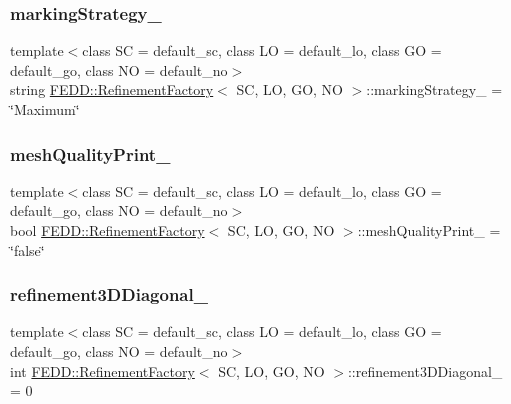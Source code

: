 \subsubsection{\texorpdfstring{marking\+Strategy\+\_\+}{markingStrategy\_}}
{\footnotesize\ttfamily template$<$class SC = default\+\_\+sc, class LO = default\+\_\+lo, class GO = default\+\_\+go, class NO = default\+\_\+no$>$ \\
string \hyperlink{classFEDD_1_1RefinementFactory}{F\+E\+D\+D\+::\+Refinement\+Factory}$<$ SC, LO, GO, NO $>$\+::marking\+Strategy\+\_\+ = \char`\"{}Maximum\char`\"{}}

\mbox{\label{classFEDD_1_1RefinementFactory_a74d0dd46b30f83f868cd749d28375a42}} 
\subsubsection{\texorpdfstring{mesh\+Quality\+Print\+\_\+}{meshQualityPrint\_}}
{\footnotesize\ttfamily template$<$class SC = default\+\_\+sc, class LO = default\+\_\+lo, class GO = default\+\_\+go, class NO = default\+\_\+no$>$ \\
bool \hyperlink{classFEDD_1_1RefinementFactory}{F\+E\+D\+D\+::\+Refinement\+Factory}$<$ SC, LO, GO, NO $>$\+::mesh\+Quality\+Print\+\_\+ = \char`\"{}false\char`\"{}}

\mbox{\label{classFEDD_1_1RefinementFactory_a7466053f06c1d52d6fb2c58db06b7a71}} 
\subsubsection{\texorpdfstring{refinement3\+D\+Diagonal\+\_\+}{refinement3DDiagonal\_}}
{\footnotesize\ttfamily template$<$class SC = default\+\_\+sc, class LO = default\+\_\+lo, class GO = default\+\_\+go, class NO = default\+\_\+no$>$ \\
int \hyperlink{classFEDD_1_1RefinementFactory}{F\+E\+D\+D\+::\+Refinement\+Factory}$<$ SC, LO, GO, NO $>$\+::refinement3\+D\+Diagonal\+\_\+ = 0}

